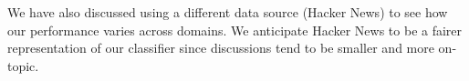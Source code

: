 \documentclass[10pt]{article}
\begin{document}

We have also discussed using a different data source (Hacker News) to
see how our performance varies across domains. We anticipate Hacker News
to be a fairer representation of our classifier since discussions tend to be 
smaller and more on-topic.

{} 

\end{document}
